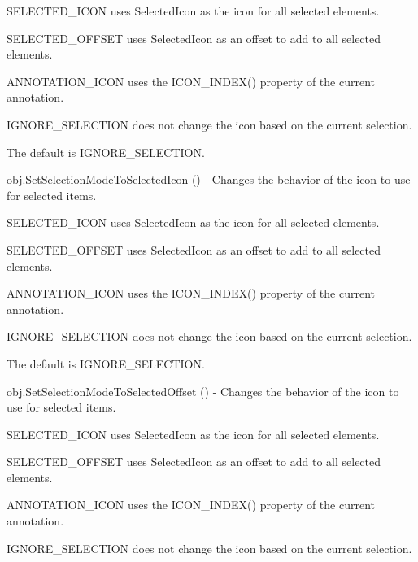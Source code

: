 \begin{DoxyItemize}
\begin{DoxyItemize}
\item S\-E\-L\-E\-C\-T\-E\-D\-\_\-\-I\-C\-O\-N uses Selected\-Icon as the icon for all selected elements. 
\item S\-E\-L\-E\-C\-T\-E\-D\-\_\-\-O\-F\-F\-S\-E\-T uses Selected\-Icon as an offset to add to all selected elements. 
\item A\-N\-N\-O\-T\-A\-T\-I\-O\-N\-\_\-\-I\-C\-O\-N uses the I\-C\-O\-N\-\_\-\-I\-N\-D\-E\-X() property of the current annotation. 
\item I\-G\-N\-O\-R\-E\-\_\-\-S\-E\-L\-E\-C\-T\-I\-O\-N does not change the icon based on the current selection. 
\end{DoxyItemize}The default is I\-G\-N\-O\-R\-E\-\_\-\-S\-E\-L\-E\-C\-T\-I\-O\-N.  
\item {\ttfamily obj.\-Set\-Selection\-Mode\-To\-Selected\-Icon ()} -\/ Changes the behavior of the icon to use for selected items. 
\begin{DoxyItemize}
\item S\-E\-L\-E\-C\-T\-E\-D\-\_\-\-I\-C\-O\-N uses Selected\-Icon as the icon for all selected elements. 
\item S\-E\-L\-E\-C\-T\-E\-D\-\_\-\-O\-F\-F\-S\-E\-T uses Selected\-Icon as an offset to add to all selected elements. 
\item A\-N\-N\-O\-T\-A\-T\-I\-O\-N\-\_\-\-I\-C\-O\-N uses the I\-C\-O\-N\-\_\-\-I\-N\-D\-E\-X() property of the current annotation. 
\item I\-G\-N\-O\-R\-E\-\_\-\-S\-E\-L\-E\-C\-T\-I\-O\-N does not change the icon based on the current selection. 
\end{DoxyItemize}The default is I\-G\-N\-O\-R\-E\-\_\-\-S\-E\-L\-E\-C\-T\-I\-O\-N.  
\item {\ttfamily obj.\-Set\-Selection\-Mode\-To\-Selected\-Offset ()} -\/ Changes the behavior of the icon to use for selected items. 
\begin{DoxyItemize}
\item S\-E\-L\-E\-C\-T\-E\-D\-\_\-\-I\-C\-O\-N uses Selected\-Icon as the icon for all selected elements. 
\item S\-E\-L\-E\-C\-T\-E\-D\-\_\-\-O\-F\-F\-S\-E\-T uses Selected\-Icon as an offset to add to all selected elements. 
\item A\-N\-N\-O\-T\-A\-T\-I\-O\-N\-\_\-\-I\-C\-O\-N uses the I\-C\-O\-N\-\_\-\-I\-N\-D\-E\-X() property of the current annotation. 
\item I\-G\-N\-O\-R\-E\-\_\-\-S\-E\-L\-E\-C\-T\-I\-O\-N does not change the icon based on the current selection. 

\end{DoxyItemize}
\end{DoxyItemize}
